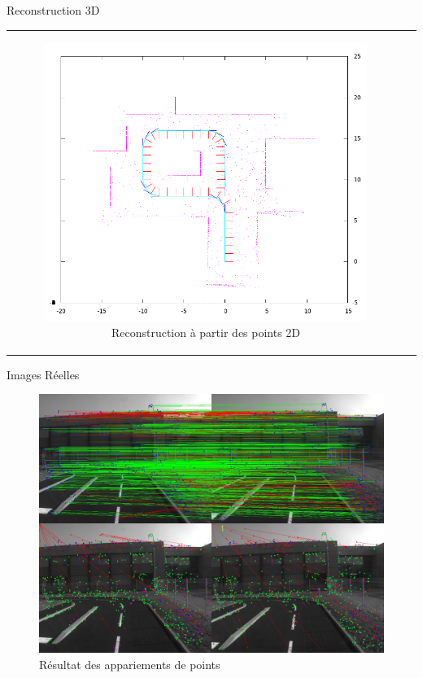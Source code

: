 \documentclass{beamer}
\begin{document}
\begin{frame}{Reconstruction 3D}
\begin{tabular}{c c}
\begin{minipage}{0.5\linewidth}
\begin{figure}
        \includegraphics[width=1.0\linewidth]{images/buildfromvideo.png}
        \caption{Reconstruction à partir des points 2D}
      \end{figure}
    \end{minipage}
  \end{tabular}
\end{frame}

\begin{frame}{Images Réelles}
  \begin{figure}
    \includegraphics[width=0.7\linewidth]{images/result.jpg}
    \caption{Résultat des appariements de points}
  \end{figure}
\end{frame}


%
\end{document}
